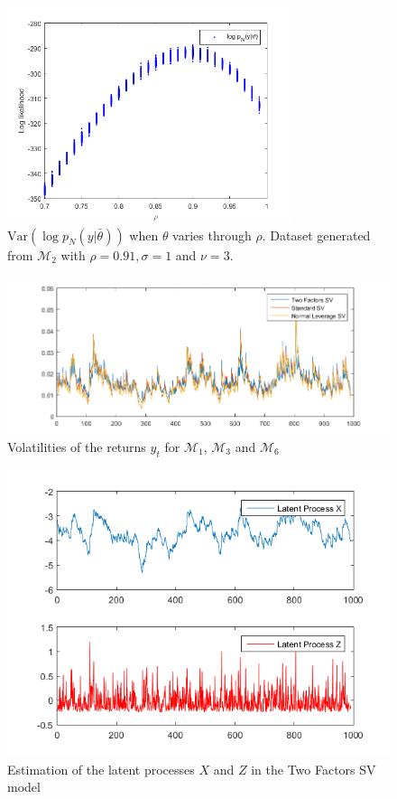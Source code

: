 \documentclass[11pt,a4,twosided,singlespacing,titlepagenumber=on]{scrreprt}
\numberwithin{equation}{chapter} %
\theoremstyle{remark}
\begin{document}
\begin{figure}[htb]
\centering
\includegraphics[width = 0.75\textwidth]{tuning_n_rho_varying}
\caption{$\text{Var}(\log p_N(y|\bar{\theta}))$ when $\theta$ varies through $\rho$. Dataset generated from $\mathcal{M}_2$ with $\rho = 0.91, \sigma = 1$ and $\nu = 3$.}
\label{tuning_n_rho_varying}
\end{figure}

\begin{figure}[htb]
\centering
\includegraphics[width = 1\textwidth]{appl_vol_3_models}
\caption{Volatilities of the returns $y_t$ for $\mathcal{M}_1$, $\mathcal{M}_3$ and $\mathcal{M}_6$}
\label{appl_vol_3_models}
\end{figure}

\begin{figure}[htb]
\centering
\includegraphics[width = 1\textwidth]{appl_twofactors_latent_processes}
\caption{Estimation of the latent processes $X$ and $Z$ in the Two Factors SV model}
\label{appl_twofactors_latent_processes}
\end{figure}
\end{document}
